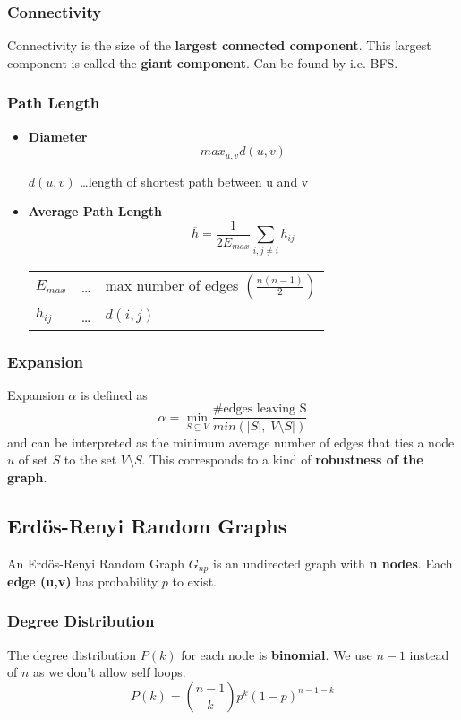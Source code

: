 \documentclass[parskip=full]{scrartcl}
\begin{document}
\subsubsection{Connectivity}
Connectivity is the size of the \textbf{largest connected component}.
This largest component is called the \textbf{giant component}.
Can be found by i.e. BFS.

\subsubsection{Path Length}
\begin{itemize}
	\item[] \textbf{Diameter}\newline
		\[max_{u,v}d(u,v)\]
		\begin{center}
			$d(u,v)$ \dots length of shortest path between u and v
		\end{center}
	\item[] \textbf{Average Path Length}\newline
		\[\overline{h} = \frac{1}{2E_{max}}\sum_{i,j \neq i} h_{ij}\]
		\begin{center}
		\begin{tabular}{l c l}
			$E_{max}$ & \dots & max number of edges $\left(\frac{n(n-1)}{2}\right)$ \\
			$h_{ij}$ & \dots & $d(i,j)$
		\end{tabular}
		\end{center}
\end{itemize}

\subsubsection{Expansion}
Expansion $\alpha$ is defined as
\[\alpha = \min_{S \subseteq V}\frac{\text{\#edges leaving S}}{min(\vert S \vert, \vert V \setminus S \vert)}\]
and can be interpreted as the minimum average number of edges that ties a node $u$ of set $S$ to the set $V \setminus S$. This corresponds to a kind of \textbf{robustness of the graph}.

\subsection{Erdös-Renyi Random Graphs}
An Erdös-Renyi Random Graph \textbf{$G_{np}$} is an undirected graph with \textbf{n nodes}. Each \textbf{edge (u,v)} has probability \textbf{$p$} to exist.

\subsubsection{Degree Distribution}
The degree distribution \textbf{$P(k)$} for each node is \textbf{binomial}. We use $n-1$ instead of $n$ as we don't allow self loops.
\[P(k) = \binom{n-1}{k}p^k(1-p)^{n-1-k}\]
\end{document}
